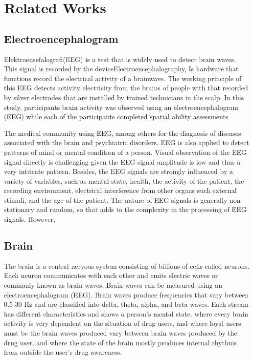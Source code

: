 \chapter{Related Works}

\section{Electroencephalogram}
Elektroensefalografi(EEG) is a test that is widely used to detect brain waves. This signal is recorded by the deviceElectroencephalography, Is hardware that functions record the electrical activity of a brainwave. The working principle of this EEG detects activity electricity from the brains of people with that recorded by silver electrodes that are installed by trained technicians in the scalp. In this study, participants brain activity was observed using an electroencephalogram (EEG) while each of the participants completed spatial ability assessments\cite{ruesch2017understanding}
\par
The medical community using EEG, among others for the diagnosis of diseases associated with the brain and psychiatric disorders. EEG is also applied to detect patterns of mind or mental condition of a person. Visual observation of the EEG signal directly is challenging given the EEG signal amplitude is low and thus a very intricate pattern. Besides, the EEG signals are strongly influenced by a variety of variables, such as mental state, health, the activity of the patient, the recording environment, electrical interference from other organs such external stimuli, and the age of the patient. The nature of EEG signals is generally non-stationary and random, so that adds to the complexity in the processing of EEG signals. However,\cite{perry2017effects}

\section{Brain}
The brain is a central nervous system consisting of billions of cells called neurons. Each neuron communicates with each other and emits electric waves or commonly known as brain waves. Brain waves can be measured using an electroencephalogram (EEG). Brain waves produce frequencies that vary between 0.5-30 Hz and are classified into delta, theta, alpha, and beta waves. Each stream has different characteristics and shows a person's mental state. where every brain activity is very dependent on the situation of drug users, and where loyal users must be the brain waves produced vary between brain waves produced by the drug user, and where the state of the brain mostly produces internal rhythms from outside the user's drug awareness.\cite{mccormick2015brain}

